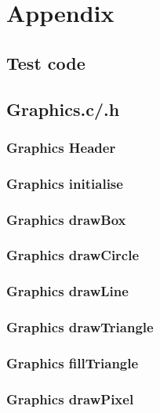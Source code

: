 \documentclass[a4paper,12pt]{article}
\newcommand{\GraphicsC}{../Graphics/Graphics.c}
\newcommand{\GraphicsH}{../Graphics/Graphics.h}
\begin{document}
\newpage
\section{Appendix}
\subsection{Test code}

\subsection{Graphics.c/.h}
\subsubsection{Graphics Header}

\subsubsection{Graphics initialise}

\newpage
\subsubsection{Graphics drawBox}

\subsubsection{Graphics drawCircle}

\newpage
\subsubsection{Graphics drawLine}

\newpage
\subsubsection{Graphics drawTriangle}

\newpage
\subsubsection{Graphics fillTriangle}

\subsubsection{Graphics drawPixel}

\end{document}
